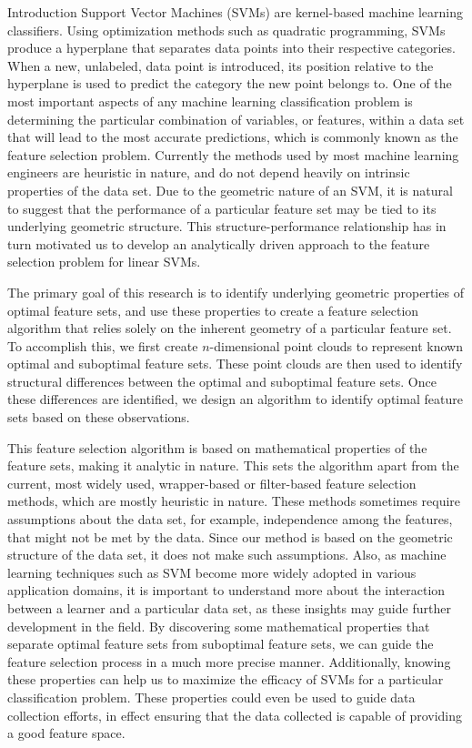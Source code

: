 \documentclass{llncs}
\begin{document}
\begin{section}{Introduction}
Support Vector Machines (SVMs) are kernel-based machine learning classifiers\cite{Vapnik}. Using optimization methods such as quadratic programming, SVMs produce a hyperplane that separates data points into their respective categories. When a new, unlabeled, data point is introduced, its position relative to the hyperplane is used to predict the category the new point belongs to. One of the most important aspects of any machine learning classification problem is determining the particular combination of variables, or features, within a data set that will lead to the most accurate predictions, which is commonly known as the feature selection problem. Currently the methods used  by most machine learning engineers are heuristic in nature, and do not depend heavily on intrinsic properties of the data set\cite{HanKamber}. Due to the geometric nature of an SVM, it is natural to suggest that the performance of a particular feature set may be tied to its underlying geometric structure. This structure-performance relationship has in turn motivated us to develop an analytically driven approach to the feature selection problem for linear SVMs.
	
The primary goal of this research is to identify underlying geometric properties of optimal feature sets, and use these properties to create a feature selection algorithm that relies solely on the inherent geometry of a particular feature set. To accomplish this, we first create $n$-dimensional point clouds to represent known optimal and suboptimal feature sets. These point clouds are then used to identify structural differences between the optimal and suboptimal feature sets. Once these differences are identified, we design an algorithm to identify optimal feature sets based on these observations.

This feature selection algorithm is based on mathematical properties of the feature sets, making it analytic in nature. This sets the algorithm apart from the current, most widely used, wrapper-based or filter-based feature selection methods, which are mostly heuristic in nature\cite{HanKamber}. These methods sometimes require assumptions about the data set, for example, independence among the features, that might not be met by the data. Since our method is based on the geometric structure of the data set, it does not make such assumptions. Also, as machine learning techniques such as SVM become more widely adopted in various application domains, it is important to understand more about the interaction between a learner and a particular data set, as these insights may guide further development in the field. By discovering some mathematical properties that separate optimal feature sets from suboptimal feature sets, we can guide the feature selection process in a much more precise manner. Additionally, knowing these properties can help us to maximize the efficacy of SVMs for a particular classification problem. These properties could even be used to guide data collection efforts, in effect ensuring that the data collected is capable of providing a good feature space.


\end{section}
\end{document}

